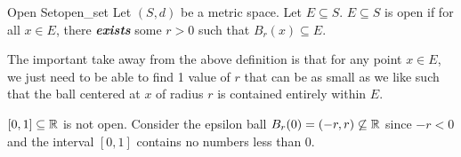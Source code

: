 \begin{defn}{Open Set}{open_set}
Let \((S, d)\) be a metric space. Let \(E \subseteq S\). 
\newline
\(E \subseteq S\) is open if for all \(x \in E\), there \textbf{\textit{exists}} some \(r > 0\) such that \(B_r(x) \subseteq E\).

\end{defn}
The important take away from the above definition is that for any point \(x \in E\), we just need to be able to find 1 value of \(r\) that can be as small as we like such that the ball centered at \(x\) of radius \(r\) is contained entirely within \(E\). 
\newline

\begin{exmp}{}{}
\([0, 1] \subseteq {\mathbb R}\) is not open. Consider the epsilon ball \(B_r(0) = (-r, r) \not\subseteq {\mathbb R}\) since \(-r < 0\) and the interval \([0, 1]\) contains no numbers less than 0.
\end{exmp}

